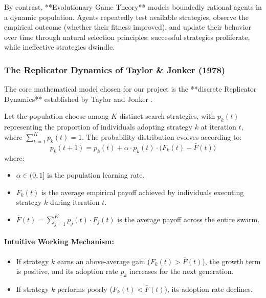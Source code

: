 By contrast, **Evolutionary Game Theory** \cite{weibull1995evolutionary} models boundedly rational agents in a dynamic population. Agents repeatedly test available strategies, observe the empirical outcome (whether their fitness improved), and update their behavior over time through natural selection principles: successful strategies proliferate, while ineffective strategies dwindle.

\subsubsection{The Replicator Dynamics of Taylor \& Jonker (1978)}
The core mathematical model chosen for our project is the **discrete Replicator Dynamics** established by Taylor and Jonker \cite{taylor1978evolutionary}. 

Let the population choose among $K$ distinct search strategies, with $p_k(t)$ representing the proportion of individuals adopting strategy $k$ at iteration $t$, where $\sum_{k=1}^K p_k(t) = 1$. The probability distribution evolves according to:
\begin{equation}
    p_k(t+1) = p_k(t) + \alpha \cdot p_k(t) \cdot \Big(F_k(t) - \bar{F}(t)\Big)
    \label{eq:replicator}
\end{equation}
where:
\begin{itemize}
    \item $\alpha \in (0, 1]$ is the population learning rate.
    \item $F_k(t)$ is the average empirical payoff achieved by individuals executing strategy $k$ during iteration $t$.
    \item $\bar{F}(t) = \sum_{j=1}^K p_j(t) \cdot F_j(t)$ is the average payoff across the entire swarm.
\end{itemize}

\paragraph{Intuitive Working Mechanism:}
\begin{itemize}
    \item If strategy $k$ earns an above-average gain ($F_k(t) > \bar{F}(t)$), the growth term is positive, and its adoption rate $p_k$ increases for the next generation.
    \item If strategy $k$ performs poorly ($F_k(t) < \bar{F}(t)$), its adoption rate declines.
\end{itemize}


